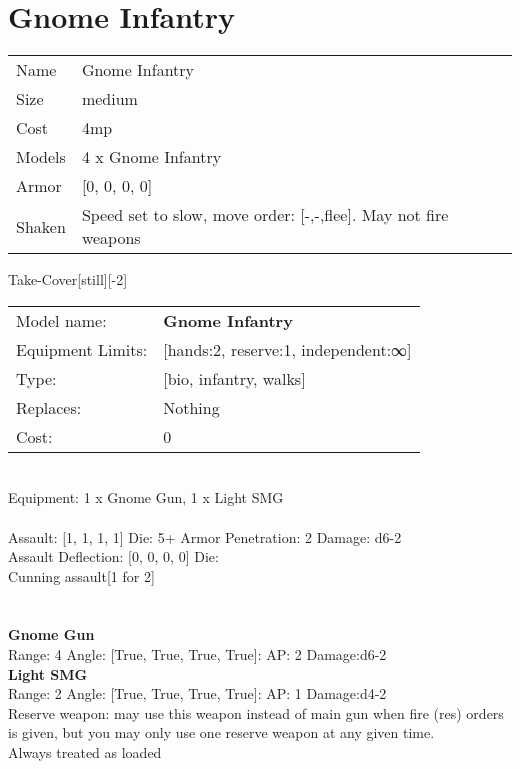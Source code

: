 \pagebreak

\section{ Gnome Infantry }

\begin{tabular}{ll}
  Name & Gnome Infantry \\
  Size & medium\\
  Cost & 4mp\\
  Models & 4 x Gnome Infantry\\
  Armor & [0, 0, 0, 0]\\
  Shaken & Speed set to slow, move order: [-,-,flee]. May not fire weapons\\
\end{tabular}

\noindent Take-Cover[still][-2]\\ 


\noindent
\begin{tabular}{ll}
Model name: &{\bf Gnome Infantry } \\
Equipment Limits: &[hands:2, reserve:1, independent:∞] \\
Type: &[bio, infantry, walks] \\
Replaces: &Nothing \\
Cost: & 0\\
\end{tabular}
\ \\
Equipment: 1 x Gnome Gun, 1 x Light SMG \\
\ \\
Assault: [1, 1, 1, 1] Die: 5+ Armor Penetration: 2 Damage: d6-2 \\
Assault Deflection: [0, 0, 0, 0] Die: \\
\indent Cunning assault[1 for 2]\\ 
 
\ \\

\ \\
{\bf Gnome Gun } \\



Range: 4  Angle: [True, True, True, True]: AP: 2 Damage:d6-2 \\




{\bf Light SMG } \\



Range: 2  Angle: [True, True, True, True]: AP: 1 Damage:d4-2 \\
Reserve weapon: may use this weapon instead of main gun when fire (res) orders is given, but you may only use one reserve weapon at any given time.\\ 
Always treated as loaded\\ 




